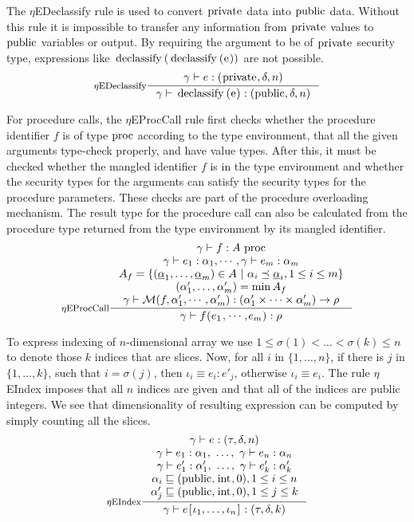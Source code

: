 \documentclass[a4paper, 10pt, draft]{report}
\newcommand{\mycode}[1]{\ensuremath{\mbox{\lstinline{#1}}}}
\begin{document}
The $\eta$EDeclassify rule is used to convert \mycode{private} data into
\mycode{public} data. Without this rule it is impossible to transfer any
information from \mycode{private} values to \mycode{public} variables or
output. By requiring the argument to be of \mycode{private} security type,
expressions like \mycode{declassify(declassify(e))} are not possible.
\[
\inference[$\eta$EDeclassify]{\gamma |- e : (\mycode{private}, \delta, n)}{\gamma |- \mycode{declassify(e)} : (\mycode{public}, \delta, n)}
\]

For procedure calls, the $\eta$EProcCall rule first checks whether the
procedure identifier $f$ is of type \mycode{proc} according to the type
environment, that all the given arguments type-check properly, and have value
types. After this, it must be checked whether the mangled identifier $f$ is in
the type environment and whether the security types for the arguments can
satisfy the security types for the procedure parameters. These checks are part
of the procedure overloading mechanism. The result type for the procedure call
can also be calculated from the procedure type returned from the type
environment by its mangled identifier.
\[ \inference[$\eta$EProcCall]{
  \gamma |- f : A\ \mycode{proc}\\
  \gamma |- e_1 : \alpha_1, \cdots, \gamma |- e_m : \alpha_m \\
  A_f = \left\{ (\underline{\alpha}_1, \dots, \underline{\alpha}_m) \in A\ |\ \alpha_i \preceq \underline{\alpha}_i, 1 \le i \le m \right\}\\
  (\alpha'_1, \dots, \alpha'_m) = \min A_f \\
  \gamma |- \mathcal{M}(f, \alpha'_1, \cdots, \alpha'_m)
  : \left( \alpha'_1 \times \cdots \times \alpha'_m \right)  \to \rho \\
}{
\gamma |- f\mycode{(}e_1\mycode{,}\cdots\mycode{,}e_m\mycode{)} : \rho
}
\]

To express indexing of $n$-dimensional array we use $1 \leq \sigma(1) < \ldots
< \sigma(k) \leq n$ to denote those $k$ indices that are slices. Now, for all
$i$ in $\{1, \ldots, n\}$, if there is $j$ in $\{1,\ldots,k\}$, such that $i =
\sigma(j)$, then $\iota_i \equiv e_i : e'_j$, otherwise $\iota_i \equiv e_i$.
The rule $\eta$EIndex imposes that all $n$ indices are given and that all of
the indices are public integers. We see that dimensionality of resulting
expression can be computed by simply counting all the slices.
\[
\inference[$\eta$EIndex]
{
  \gamma |- e : \left( \tau, \delta, n \right) \\
  \gamma |- e_1 : \alpha_1,\ \ldots,\ \gamma |- e_n : \alpha_n \\
  \gamma |- e'_1 : \alpha'_1,\ \ldots,\ \gamma |- e'_k : \alpha'_k \\
  \alpha_i \sqsubseteq (\mycode{public}, \mycode{int}, 0), 1 \le i \le n \\
  \alpha'_j \sqsubseteq (\mycode{public}, \mycode{int}, 0), 1 \le j \le k
}
{
  \gamma |- e \mycode{[} \iota_1, \ldots, \iota_n \mycode{]} : \left(\tau, \delta, k\right)
}
\]
\end{document}
